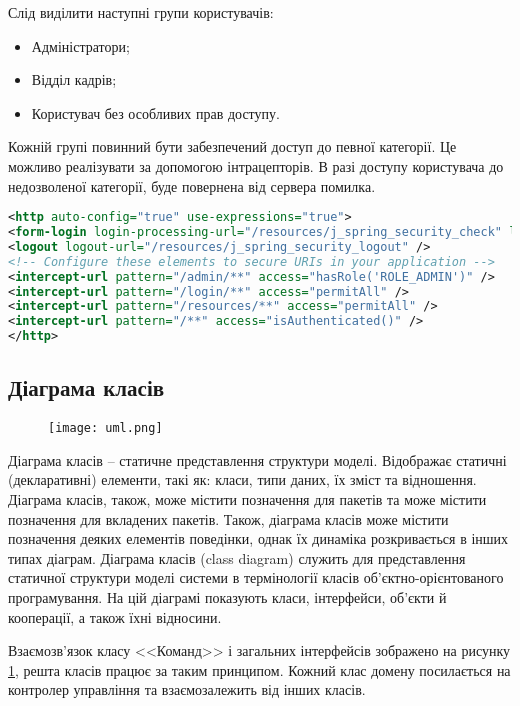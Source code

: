 Слід виділити наступні групи користувачів:
\begin{itemize}
	\item Адміністратори;
	\item Відділ кадрів;
	\item Користувач без особливих прав доступу.
\end{itemize}

\par Кожній групі повинний бути забезпечений доступ до певної категорії. Це можливо реалізувати за допомогою інтрацепторів. В разі доступу користувача до недозволеної категорії, буде повернена від сервера помилка.

\begin{lstlisting}[language=Xml]
<http auto-config="true" use-expressions="true">
<form-login login-processing-url="/resources/j_spring_security_check" login-page="/login" authentication-failure-url="/login?login_error=t" />
<logout logout-url="/resources/j_spring_security_logout" />
<!-- Configure these elements to secure URIs in your application -->
<intercept-url pattern="/admin/**" access="hasRole('ROLE_ADMIN')" />
<intercept-url pattern="/login/**" access="permitAll" />
<intercept-url pattern="/resources/**" access="permitAll" />
<intercept-url pattern="/**" access="isAuthenticated()" />
</http>
\end{lstlisting}


\subsection{Діаграма класів}
\begin{figure}[!ht]
	\centering
			\texttt{[image: uml.png]}
			\label{pic:uml}
	\end{figure}
\par Діаграма класів -- статичне представлення структури моделі. Відображає статичні (декларативні) елементи, такі як: класи, типи даних, їх зміст та відношення. Діаграма класів, також, може містити позначення для пакетів та може містити позначення для вкладених пакетів. Також, діаграма класів може містити позначення деяких елементів поведінки, однак їх динаміка розкривається в інших типах діаграм. Діаграма класів (class diagram) служить для представлення статичної структури моделі системи в термінології класів об'єктно-орієнтованого програмування. На цій діаграмі показують класи, інтерфейси, об'єкти й кооперації, а також їхні відносини.
\par Взаємозв'язок класу <<Команд>> і загальних інтерфейсів зображено на рисунку \ref{pic:uml}, решта класів працює за таким принципом. Кожний клас домену посилається на контролер управління та взаємозалежить від інших класів. 




